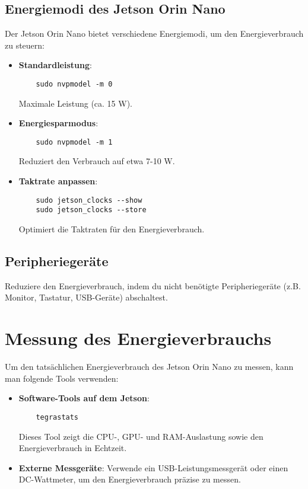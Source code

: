 \documentclass[12pt]{article}
\begin{document}
\subsection{Energiemodi des Jetson Orin Nano}
Der Jetson Orin Nano bietet verschiedene Energiemodi, um den Energieverbrauch zu steuern:
\begin{itemize}
    \item \textbf{Standardleistung}: 
    \begin{verbatim}
    sudo nvpmodel -m 0
    \end{verbatim}
    Maximale Leistung (ca. 15 W).
    
    \item \textbf{Energiesparmodus}: 
    \begin{verbatim}
    sudo nvpmodel -m 1
    \end{verbatim}
    Reduziert den Verbrauch auf etwa 7-10 W.
    
    \item \textbf{Taktrate anpassen}: 
    \begin{verbatim}
    sudo jetson_clocks --show
    sudo jetson_clocks --store
    \end{verbatim}
    Optimiert die Taktraten für den Energieverbrauch.
\end{itemize}

\subsection{Peripheriegeräte}
Reduziere den Energieverbrauch, indem du nicht benötigte Peripheriegeräte (z.B. Monitor, Tastatur, USB-Geräte) abschaltest.

\clearpage
\section{Messung des Energieverbrauchs}
Um den tatsächlichen Energieverbrauch des Jetson Orin Nano zu messen, kann man folgende Tools verwenden:
\begin{itemize}
    \item \textbf{Software-Tools auf dem Jetson}:
    \begin{verbatim}
    tegrastats
    \end{verbatim}
    Dieses Tool zeigt die CPU-, GPU- und RAM-Auslastung sowie den Energieverbrauch in Echtzeit.

    \item \textbf{Externe Messgeräte}: 
    Verwende ein USB-Leistungsmessgerät oder einen DC-Wattmeter, um den Energieverbrauch präzise zu messen.
\end{itemize}
\end{document}
